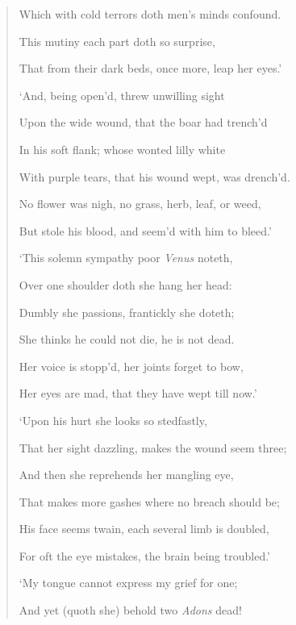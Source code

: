 \documentclass[a4paper, 11pt, oneside, polutonikogreek, english]{article}
\begin{document}
\begin{quotation}
Which with cold terrors doth men's minds confound.

\hspace*{15mm}This mutiny each part doth so surprise,

\hspace*{15mm}That from their dark beds, once more, leap her eyes.'

\bigskip

`And, being open'd, threw unwilling sight

Upon the wide wound, that the boar had trench'd

In his soft flank; whose wonted lilly white

With purple tears, that his wound wept, was drench'd.

\hspace*{15mm}No flower was nigh, no grass, herb, leaf, or weed,

\hspace*{15mm}But stole his blood, and seem'd with him to bleed.'

\bigskip

`This solemn sympathy poor \emph{Venus} noteth,

Over one shoulder doth she hang her head:

Dumbly she passions, frantickly she doteth;

She thinks he could not die, he is not dead.

\hspace*{15mm}Her voice is stopp'd, her joints forget to bow,

\hspace*{15mm}Her eyes are mad, that they have wept till now.'

\bigskip

`Upon his hurt she looks so stedfastly,

That her sight dazzling, makes the wound seem three;

And then she reprehends her mangling eye,

That makes more gashes where no breach should be;

\hspace*{15mm}His face seems twain, each several limb is doubled,

\hspace*{15mm}For oft the eye mistakes, the brain being troubled.'

\bigskip

`My tongue cannot express my grief for one;

And yet (quoth she) behold two \emph{Adons} dead!


\end{quotation}
\end{document}

